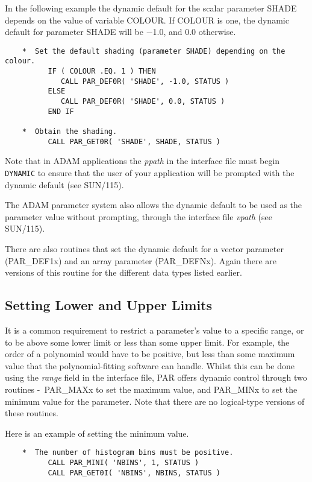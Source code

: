 \documentclass[twoside,11pt]{article}
\newcommand{\xref}[3]{#1}
\newcommand{\xlabel}[1]{}
\newcommand{\dash}{--}
\renewcommand{\dash}{-}
\begin{document}
In the following example the dynamic default for the scalar parameter
SHADE depends on the value of variable COLOUR.  If COLOUR is one, the
dynamic default for parameter SHADE will be $-$1.0, and 0.0 otherwise. 

\begin{verbatim}
    *  Set the default shading (parameter SHADE) depending on the colour.
          IF ( COLOUR .EQ. 1 ) THEN
             CALL PAR_DEF0R( 'SHADE', -1.0, STATUS )
          ELSE
             CALL PAR_DEF0R( 'SHADE', 0.0, STATUS )
          END IF

    *  Obtain the shading.
          CALL PAR_GET0R( 'SHADE', SHADE, STATUS )
\end{verbatim}


Note that in {\footnotesize ADAM} applications the {\em ppath\/} in the
interface file must begin {\tt DYNAMIC} to ensure that the user of your
application will be prompted with the dynamic default (see 
\xref{SUN/115}{sun115}{}).

The {\footnotesize ADAM} parameter system also allows the dynamic 
default to be used as the parameter value without prompting, through 
the interface file {\em vpath\/} (see 
\xref{SUN/115}{sun115}{}).


There are also routines that set the dynamic default for a vector
parameter (PAR\_DEF1x) and an array parameter (PAR\_DEFNx).   Again
there are versions of this routine for the different data types listed
earlier. 

\subsection{\xlabel{setting_lower_and_upper_limits}Setting Lower and Upper Limits} 

It is a common requirement to restrict a parameter's value to a specific
range, or to be above some lower limit or less than some upper limit. 
For example, the order of a polynomial would have to be positive, but
less than some maximum value that the polynomial-fitting software can
handle.  Whilst this can be done using the {\em range\/} field in the
interface file, PAR offers dynamic control through two
routines \dash\ PAR\_MAXx to set the maximum value, and PAR\_MINx to set the
minimum value for the parameter.  Note that there are no logical-type
versions of these routines. 

Here is an example of setting the minimum value.

\begin{verbatim}
    *  The number of histogram bins must be positive.
          CALL PAR_MINI( 'NBINS', 1, STATUS )
          CALL PAR_GET0I( 'NBINS', NBINS, STATUS )
\end{verbatim}
\end{document}
